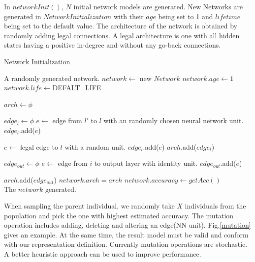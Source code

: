 \documentclass[conference]{IEEEtran}
\begin{document}
In $networkInit()$, $N$ initial network models are generated. New Networks are generated in $Network Initialization$ with their $age $ being set to 1 and $lifetime$ being set to the default value. The architecture of the network is obtained by randomly adding legal connections. A legal architecture is one with all hidden states having a positive in-degree and without any go-back connections. 

 \begin{algorithm}[H]  
	\caption{ Network Initialization}
	
	
	\begin{algorithmic}[1]  
		\Ensure A randomly generated network.
    \State $network\gets $ new $Network$
    \State $network.age\gets1$
    \State $network.life\gets $DEFALT\_LIFE 
    
    \State $arch\gets \phi$

    \State $edge_l \gets \phi$
    \State $e \gets$ edge from $l'$ to $l$ with an randomly chosen neural network unit.
    \State $edge_l$.add($e$)
    \EndIf
		\EndFor

        \State  $e \gets$ legal edge to $l$ with a random unit.
        \State $edge_l$.add($e$)
		\EndIf
    \State $arch$.add($edge_l$)
		\EndFor
    
    \State $edge_{out} \gets \phi$
      \State $e \gets$ edge from $i$ to output layer with identity unit.
      \State $edge_{out}$.add($e$)
    \EndFor

    \State $arch$.add($edge_{out}$)
    \State $network.arch=arch$
    \State $network.accuracy\gets getAcc()$
    \\
		\Return The $network$ generated.
		
	\end{algorithmic}  
\end{algorithm}  

  When sampling the parent individual, we randomly take $X$ individuals from the population and pick the one with highest estimated accuracy. The mutation operation includes adding, deleting and altering an edge(NN unit). Fig.\ref{mutation} gives an example. At the same time, the result model must be valid and conform with our representation definition. Currently mutation operations are stochastic. A better heuristic approach can be used to improve performance.
\end{document}
